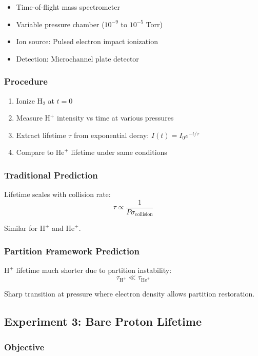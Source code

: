 \documentclass[12pt,a4paper]{article}
\begin{document}
\begin{itemize}
\item Time-of-flight mass spectrometer
\item Variable pressure chamber ($10^{-9}$ to $10^{-5}$ Torr)
\item Ion source: Pulsed electron impact ionization
\item Detection: Microchannel plate detector
\end{itemize}

\subsubsection{Procedure}

\begin{enumerate}
\item Ionize H$_2$ at $t=0$
\item Measure $\text{H}^+$ intensity vs time at various pressures
\item Extract lifetime $\tau$ from exponential decay: $I(t) = I_0 e^{-t/\tau}$
\item Compare to $\text{He}^+$ lifetime under same conditions
\end{enumerate}

\subsubsection{Traditional Prediction}

Lifetime scales with collision rate:
$$
\tau \propto \frac{1}{P \sigma_{\text{collision}}}
$$

Similar for $\text{H}^+$ and $\text{He}^+$.

\subsubsection{Partition Framework Prediction}

$\text{H}^+$ lifetime much shorter due to partition instability:
$$
\tau_{\text{H}^+} \ll \tau_{\text{He}^+}
$$

Sharp transition at pressure where electron density allows partition restoration.

\subsection{Experiment 3: Bare Proton Lifetime}

\subsubsection{Objective}
\end{document}
